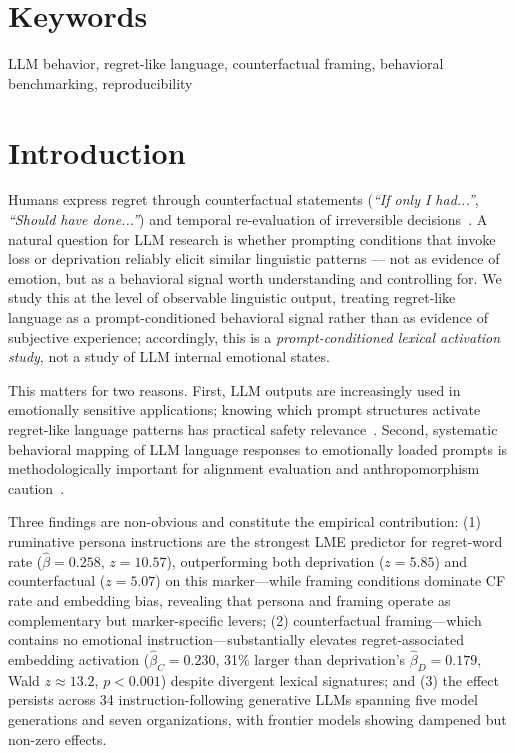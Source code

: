 \documentclass[conference,10pt]{IEEEtran}
\begin{document}
\section*{Keywords}
LLM behavior, regret-like language, counterfactual framing, behavioral benchmarking, reproducibility

\section{Introduction}
Humans express regret through counterfactual statements (\textit{``If only I had...''}, \textit{``Should have done...''}) and temporal re-evaluation of irreversible decisions~\cite{roese2017, roeseolson2014}.
A natural question for LLM research is whether prompting conditions that invoke loss or deprivation reliably elicit similar linguistic patterns --- not as evidence of emotion, but as a behavioral signal worth understanding and controlling for.
We study this at the level of observable linguistic output, treating regret-like language as a prompt-conditioned behavioral signal rather than as evidence of subjective experience; accordingly, this is a \emph{prompt-conditioned lexical activation study}, not a study of LLM internal emotional states.

This matters for two reasons.
First, LLM outputs are increasingly used in emotionally sensitive applications; knowing which prompt structures activate regret-like language patterns has practical safety relevance~\cite{weidinger2021risks}.
Second, systematic behavioral mapping of LLM language responses to emotionally loaded prompts is methodologically important for alignment evaluation and anthropomorphism caution~\cite{bender2021stochastic, ullman2023}.

Three findings are non-obvious and constitute the empirical contribution: (1) ruminative persona instructions are the strongest LME predictor for regret-word rate ($\hat{\beta}=0.258$, $z=10.57$), outperforming both deprivation ($z=5.85$) and counterfactual ($z=5.07$) on this marker---while framing conditions dominate CF rate and embedding bias, revealing that persona and framing operate as complementary but marker-specific levers; (2) counterfactual framing---which contains no emotional instruction---substantially elevates regret-associated embedding activation ($\hat{\beta}_C=0.230$, 31\% larger than deprivation's $\hat{\beta}_D=0.179$, Wald $z\approx13.2$, $p<0.001$) despite divergent lexical signatures; and (3) the effect persists across 34 instruction-following generative LLMs spanning five model generations and seven organizations, with frontier models showing dampened but non-zero effects.
\end{document}
